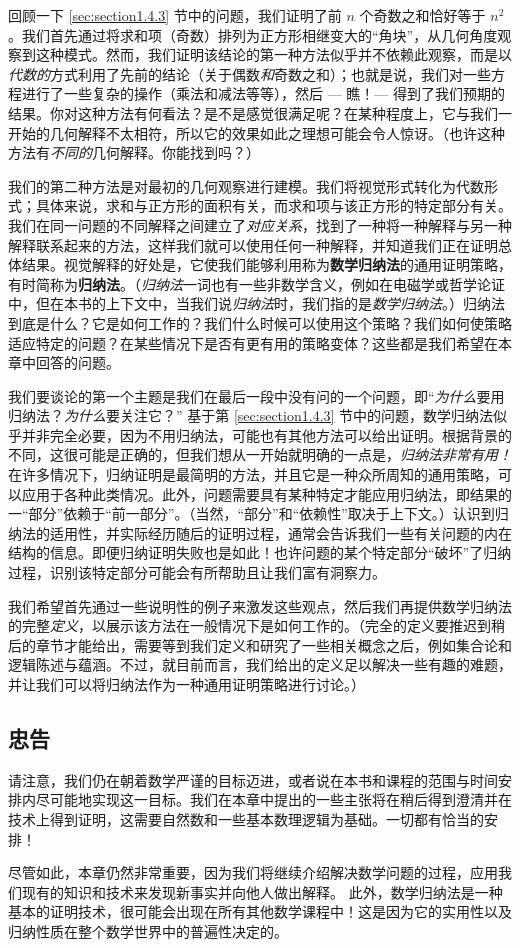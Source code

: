 回顾一下 \ref{sec:section1.4.3} 节中的问题，我们证明了前 $n$ 个奇数之和恰好等于 $n^2$。我们首先通过将求和项（奇数）排列为正方形相继变大的``角块''，从几何角度观察到这种模式。然而，我们证明该结论的第一种方法似乎并不依赖此观察，而是以\emph{代数的}方式利用了先前的结论（关于偶数\emph{和}奇数之和）；也就是说，我们对一些方程进行了一些复杂的操作（乘法和减法等等），然后 --- 瞧！--- 得到了我们预期的结果。你对这种方法有何看法？是不是感觉很满足呢？在某种程度上，它与我们一开始的几何解释不太相符，所以它的效果如此之理想可能会令人惊讶。（也许这种方法有\emph{不同的}几何解释。你能找到吗？）

我们的第二种方法是对最初的几何观察进行建模。我们将视觉形式转化为代数形式；具体来说，求和与正方形的面积有关，而求和项与该正方形的特定部分有关。我们在同一问题的不同解释之间建立了\emph{对应关系}，找到了一种将一种解释与另一种解释联系起来的方法，这样我们就可以使用任何一种解释，并知道我们正在证明总体结果。视觉解释的好处是，它使我们能够利用称为\textbf{数学归纳法}的通用证明策略，有时简称为\textbf{归纳法}。（\emph{归纳法}一词也有一些非数学含义，例如在电磁学或哲学论证中，但在本书的上下文中，当我们说\emph{归纳法}时，我们指的是\emph{数学归纳法}。）归纳法到底是什么？它是如何工作的？我们什么时候可以使用这个策略？我们如何使策略适应特定的问题？在某些情况下是否有更有用的策略变体？这些都是我们希望在本章中回答的问题。

我们要谈论的第一个主题是我们在最后一段中没有问的一个问题，即``\emph{为什么}要用归纳法？\emph{为什么}要关注它？'' 基于第 \ref{sec:section1.4.3} 节中的问题，数学归纳法似乎并非完全必要，因为不用归纳法，可能也有其他方法可以给出证明。根据背景的不同，这很可能是正确的，但我们想从一开始就明确的一点是，\emph{归纳法非常有用！}在许多情况下，归纳证明是最简明的方法，并且它是一种众所周知的通用策略，可以应用于各种此类情况。此外，问题需要具有某种特定才能应用归纳法，即结果的一``部分''依赖于``前一部分''。（当然，``部分''和``依赖性''取决于上下文。）认识到归纳法的适用性，并实际经历随后的证明过程，通常会告诉我们一些有关问题的内在结构的信息。即便归纳证明失败也是如此！也许问题的某个特定部分``破坏''了归纳过程，识别该特定部分可能会有所帮助且让我们富有洞察力。

我们希望首先通过一些说明性的例子来激发这些观点，然后我们再提供数学归纳法的完整\emph{定义}，以展示该方法在一般情况下是如何工作的。（完全的定义要推迟到稍后的章节才能给出，需要等到我们定义和研究了一些相关概念之后，例如集合论和逻辑陈述与蕴涵。不过，就目前而言，我们给出的定义足以解决一些有趣的难题，并让我们可以将归纳法作为一种通用证明策略进行讨论。）

\subsection{忠告}

请注意，我们仍在朝着数学严谨的目标迈进，或者说在本书和课程的范围与时间安排内尽可能地实现这一目标。我们在本章中提出的一些主张将在稍后得到澄清并在技术上得到证明，这需要自然数和一些基本数理逻辑为基础。一切都有恰当的安排！

尽管如此，本章仍然非常重要，因为我们将继续介绍解决数学问题的过程，应用我们现有的知识和技术来发现新事实并向他人做出解释。 此外，数学归纳法是一种基本的证明技术，很可能会出现在所有其他数学课程中！这是因为它的实用性以及归纳性质在整个数学世界中的普遍性决定的。